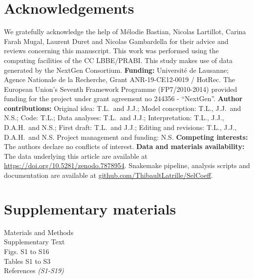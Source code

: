 \documentclass[12pt]{article}
\begin{document}
\section*{Acknowledgements}
\label{sec:acknowledgment}
We gratefully acknowledge the help of Mélodie Bastian, Nicolas Lartillot, Carina Farah Mugal, Laurent Duret and Nicolas Gambardella for their advice and reviews concerning this manuscript.
This work was performed using the computing facilities of the CC LBBE/PRABI\@.
This study makes use of data generated by the NextGen Consortium.
\textbf{Funding:}
Université de Lausanne; Agence Nationale de la Recherche, Grant ANR-19-CE12-0019 / HotRec.
The European Union’s Seventh Framework Programme (FP7/2010-2014) provided funding for the project under grant agreement no 244356 - “NextGen”.
\textbf{Author contributions:}
Original idea: T.L.\ and J.J.;
Model conception: T.L., J.J.\ and N.S.;
Code: T.L.;
Data analyses: T.L.\ and J.J.;
Interpretation: T.L., J.J., D.A.H.\ and N.S.;
First draft: T.L.\ and J.J.;
Editing and revisions: T.L., J.J., D.A.H.\ and N.S.
Project management and funding: N.S\@.
\textbf{Competing interests:}
The authors declare no conflicts of interest.
\textbf{Data and materials availability:}
The data underlying this article are available at \url{https://doi.org/10.5281/zenodo.7878954}.
Snakemake pipeline, analysis scripts and documentation are available at \href{https://github.com/ThibaultLatrille/SelCoeff}{github.com/ThibaultLatrille/SelCoeff}.


\section*{Supplementary materials}
Materials and Methods\\
Supplementary Text\\
Figs. S1 to S16\\
Tables S1 to S3\\
References \textit{(S1-S19)}
\end{document}
